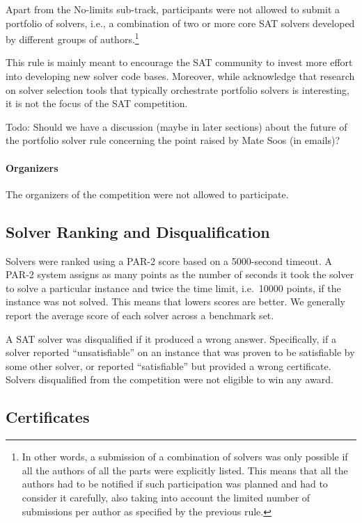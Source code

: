\documentclass{elsarticle}
\newcommand{\todo}[1]{{\color{purple}Todo: #1}}
\begin{document}
Apart from the No-limits sub-track, participants were not allowed to submit a portfolio of solvers,
i.e., a combination of two or more core SAT solvers developed by different groups of authors.\footnote{
In other words, a submission of a combination of solvers was only possible if all the authors of all the parts
were explicitly listed. This means that all the authors had to be notified if such participation
was planned and had to consider it carefully, also taking into account the limited number of submissions per author
as specified by the previous rule.}

This rule is mainly meant to encourage the SAT community to invest more effort into developing new solver code bases.
Moreover, while acknowledge that research on solver selection tools that typically orchestrate portfolio solvers 
is interesting, it is not the focus of the SAT competition.

\todo{Should we have a discussion (maybe in later sections)
about the future of the portfolio solver rule
concerning the point raised by Mate Soos (in emails)?}

\paragraph{Organizers}
The organizers of the competition were not allowed to participate.

\subsection{Solver Ranking and Disqualification}

Solvers were ranked using a PAR-2 score based on a \num{5000}-second timeout.
A PAR-2 system assigns as many points as the number of seconds it took the solver
to solve a particular instance and twice the time limit, i.e.~\num{10000} points,
if the instance was not solved. This means that lowers scores are better.
We generally report the average score of each solver
across a benchmark set.

A SAT solver was disqualified if it produced a wrong answer. 
Specifically, if a solver reported ``unsatisfiable'' on an instance that 
was proven to be satisfiable by some other solver, or reported ``satisfiable'' 
but provided a wrong certificate. Solvers disqualified from the competition were
not eligible to win any award. 

\subsection{Certificates}
\end{document}

